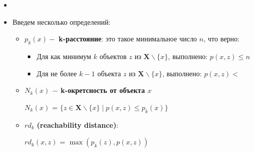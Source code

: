 \begin{enumerate}
\begin{enumerate}
\begin{itemize}
\begin{itemize}
                            \item {}

                            \item \colorbox{purple!20}{Введем несколько определений:}
                            \begin{itemize}
                                \item \begin{definition}
                                    $p_k(x) -$ \textbf{k-расстояние}: это такое минимальное число $n$, что верно:
                                    \begin{itemize}
                                        \item Для как минимум $k$ объектов $z$ из $\mathbf{X} \backslash \{ x \}$, выполнено: $p(x, z) \leq n$
    
                                        \item Для не более $k - 1$ объекта $z$ из $\mathbf{X} \backslash \{ x \}$, выполнено: $p(x, z) < $
                                    \end{itemize}
                                \end{definition}


                                \item \begin{definition}
                                    \textbf{$N_k(x)$ $-$ k-окретсность от объекта $x$}
                                    \begin{center}
                                        $N_k(x)$ = $\{z \in \mathbf{X} \backslash \{ x \} \mid p(x, z) \leq p_k(x)\}$
                                    \end{center}
                                \end{definition}

                                \item \begin{definition}
                                    $rd_k$ \textbf{(reachability distance)}:
                                    \begin{center}
                                        $rd_k(x, z)$ = $\max (p_k(z), p(x, z))$ 
                                    \end{center}


\end{definition}
\end{itemize}
\end{itemize}
\end{itemize}
\end{enumerate}
\end{enumerate}
